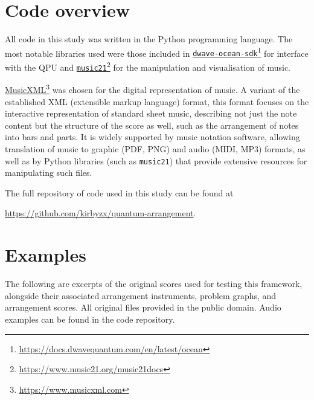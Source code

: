 \documentclass[12pt]{article}
\theoremstyle{definition}
\begin{document}
\clearpage
\appendix
{}

\section{Code overview}
\label{app:code}

All code in this study was written in the Python programming language. The most notable libraries used were those included in \href{https://docs.dwavequantum.com/en/latest/ocean}{\texttt{dwave-ocean-sdk}}\footnote{\url{https://docs.dwavequantum.com/en/latest/ocean}} for interface with the QPU and \href{https://www.music21.org/music21docs}{\texttt{music21}}\footnote{\url{https://www.music21.org/music21docs}} for the manipulation and visualisation of music.

\href{https://www.musicxml.com}{MusicXML}\footnote{\url{https://www.musicxml.com}} was chosen for the digital representation of music. A variant of the established XML (extensible markup language) format, this format focuses on the interactive representation of standard sheet music, describing not just the note content but the structure of the score as well, such as the arrangement of notes into bars and parts. It is widely supported by music notation software, allowing translation of music to graphic (PDF, PNG) and audio (MIDI, MP3) formats, as well as by Python libraries (such as \texttt{music21}) that provide extensive resources for manipulating such files.

The full repository of code used in this study can be found at
\begin{center}
    \url{https://github.com/kirbyzx/quantum-arrangement}.
\end{center}

\section{Examples}
\label{app:examples}

The following are excerpts of the original scores used for testing this framework, alongside their associated arrangement instruments, problem graphs, and arrangement scores. All original files provided in the public domain. Audio examples can be found in the code repository.
\end{document}
